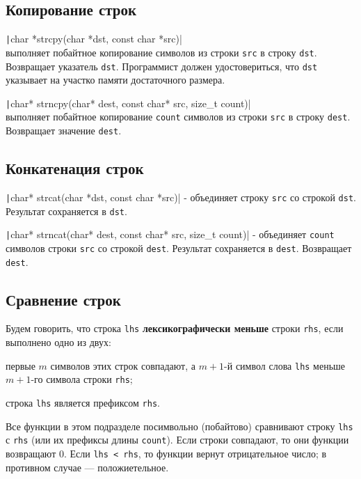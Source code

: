 \subsection{Копирование строк}

\texttt|char *strcpy(char *dst, const char *src)|\\
выполняет побайтное копирование символов из строки \verb|src|
в строку \verb|dst|. Возвращает указатель \verb|dst|. Программист должен удостовериться, что \verb|dst| указывает
на участко памяти достаточного размера.

\texttt|char* strncpy(char* dest, const char* src, size_t count)|\\
выполняет побайтное копирование \verb|count| символов из строки \verb|src| в строку \verb|dest|. Возвращает значение
\verb|dest|.

\subsection{Конкатенация строк}
\texttt|char* strcat(char *dst, const char *src)| - объединяет строку \verb|src| со строкой \verb|dst|.
Результат сохраняется в \verb|dst|. 

\texttt|char* strncat(char* dest, const char* src, size_t count)| - объединяет \verb|count|
символов строки \verb|src| со строкой \verb|dest|. Результат сохраняется в \verb|dest|.
Возвращает \verb|dest|.

\subsection{Сравнение строк}
Будем говорить, что строка \verb|lhs| \textbf{лексикографически меньше} \label{def:lex_cmp}
строки \verb|rhs|, если выполнено одно из двух:
\begin{enuminl}
  \item первые $m$ символов этих строк совпадают, а $m+1$-й символ слова \verb|lhs| меньше $m+1$-го символа
  строки \verb|rhs|; \enspace
  \item строка \verb|lhs| является префиксом \verb|rhs|.
\end{enuminl}

Все функции в этом подразделе посимвольно (побайтово) сравнивают строку \verb|lhs|
с \verb|rhs| (или их префиксы длины \verb|count|). Если строки совпадают, то они
функции возвращают 0. Если \verb|lhs < rhs|, то функции вернут отрицательное число;
в противном случае --- положиетельное.

\vspace{0.65cm}

